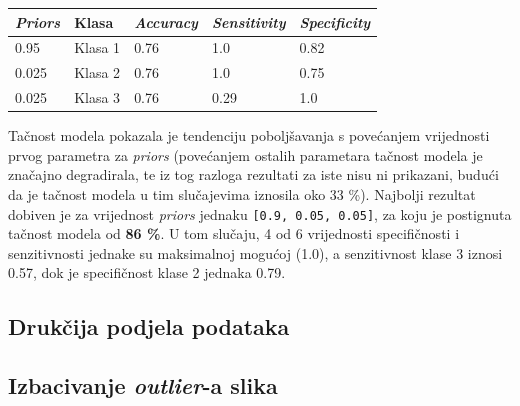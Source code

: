\documentclass[12pt,a4paper]{article}
\begin{document}
\begin{table}[H]
\centering
\begin{tabular}{|l|l|l|l|l|}
\hline
\textbf{\textit{Priors}} 	& \textbf{Klasa}   	& \textbf{\textit{Accuracy}} 	& \textbf{\textit{Sensitivity}} 	& \textbf{\textit{Specificity}} 		\\ \hline
0.95            				& Klasa 1 			& 0.76              					& 1.0                  					& 0.82                 						\\ \hline
0.025           				& Klasa 2 			& 0.76              					& 1.0                  					& 0.75                 						\\ \hline
0.025           				& Klasa 3 			& 0.76              					& 0.29                 					& 1.0                  						\\ \hline
\end{tabular}
\end{table}

\newpage

Tačnost modela pokazala je tendenciju poboljšavanja s povećanjem vrijednosti prvog parametra za \textit{priors} (povećanjem ostalih parametara tačnost modela je značajno degradirala, te iz tog razloga rezultati za iste nisu ni prikazani, budući da je tačnost modela u tim slučajevima iznosila oko 33 \%). Najbolji rezultat dobiven je za vrijednost \textit{priors} jednaku \texttt{[0.9, 0.05, 0.05]}, za koju je postignuta tačnost modela od \textbf{86 \%}. U tom slučaju, 4 od 6 vrijednosti specifičnosti i senzitivnosti jednake su maksimalnoj mogućoj (1.0), a senzitivnost klase 3 iznosi 0.57, dok je specifičnost klase 2 jednaka 0.79.

\subsection{Drukčija podjela podataka}

\subsection{Izbacivanje \textit{outlier}-a slika}
\end{document}

